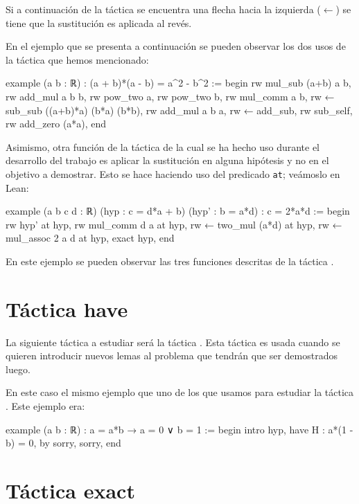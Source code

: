 Si a continuación de la táctica  se encuentra
una flecha hacia la izquierda (\(←\)) se tiene que la sustitución es
aplicada al revés.

En el ejemplo que se presenta a continuación se pueden observar los dos
usos de la táctica  que hemos mencionado:

\begin{leancode}
example (a b : ℝ) : (a + b)*(a - b) = a^2 - b^2 :=
begin
  rw mul_sub (a+b) a b,
  rw add_mul a b b,
  rw pow_two a,
  rw pow_two b,
  rw mul_comm a b,
  rw ← sub_sub ((a+b)*a) (b*a) (b*b),
  rw add_mul a b a,
  rw ← add_sub,
  rw sub_self,
  rw add_zero (a*a),
end
\end{leancode}

Asimismo, otra función de la táctica  de la
cual se ha hecho uso durante el desarrollo del trabajo es aplicar la
sustitución en alguna hipótesis y no en el objetivo a demostrar. Esto se
hace haciendo uso del predicado \texttt{at}; veámoslo en Lean:
\begin{leancode}
example (a b c d : ℝ) (hyp : c = d*a + b) (hyp' : b = a*d) : c = 2*a*d :=
begin
  rw hyp' at hyp,
  rw mul_comm d a at hyp,
  rw ← two_mul (a*d) at hyp,
  rw ← mul_assoc 2 a d at hyp,
  exact hyp,
end
\end{leancode}

En este ejemplo se pueden observar las tres funciones descritas de la
táctica .

\section{Táctica have}

La siguiente táctica a estudiar será la táctica
. Esta táctica es usada cuando se quieren
introducir nuevos lemas al problema que tendrán que ser demostrados
luego.

En este caso el mismo ejemplo que uno de los que usamos para estudiar la
táctica . Este ejemplo era:

\begin{leancode}
example (a b : ℝ) : a = a*b → a = 0 ∨ b = 1 :=
begin
  intro hyp,
  have H : a*(1 - b) = 0, by sorry,
  sorry,
end
\end{leancode}

\section{Táctica exact}

